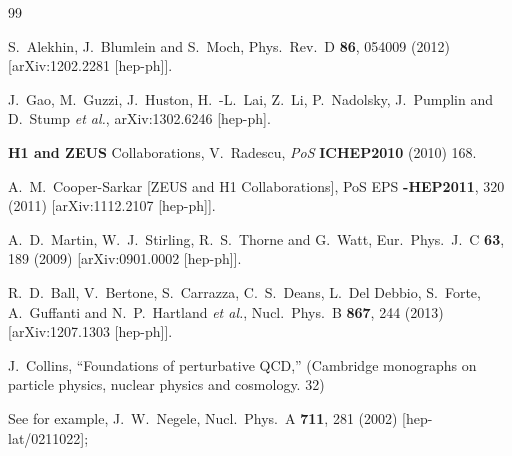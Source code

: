 \begin{thebibliography}{99}


  S.~Alekhin, J.~Blumlein and S.~Moch,
  Phys.\ Rev.\ D {\bf 86}, 054009 (2012)
  [arXiv:1202.2281 [hep-ph]].

  J.~Gao, M.~Guzzi, J.~Huston, H.~-L.~Lai, Z.~Li, P.~Nadolsky, J.~Pumplin and D.~Stump {\it et al.},
  arXiv:1302.6246 [hep-ph].

{\bf H1 and ZEUS} Collaborations, V.~Radescu, %
  {\em PoS} {\bf
  ICHEP2010} (2010) 168.

  A.~M.~Cooper-Sarkar [ZEUS and H1 Collaborations],
  PoS EPS {\bf -HEP2011}, 320 (2011)
  [arXiv:1112.2107 [hep-ph]].

  A.~D.~Martin, W.~J.~Stirling, R.~S.~Thorne and G.~Watt,
  Eur.\ Phys.\ J.\ C {\bf 63}, 189 (2009)
  [arXiv:0901.0002 [hep-ph]].

  R.~D.~Ball, V.~Bertone, S.~Carrazza, C.~S.~Deans, L.~Del Debbio, S.~Forte, A.~Guffanti and N.~P.~Hartland {\it et al.},
  Nucl.\ Phys.\ B {\bf 867}, 244 (2013)
  [arXiv:1207.1303 [hep-ph]].



  J.~Collins,
  ``Foundations of perturbative QCD,''
  (Cambridge monographs on particle physics, nuclear physics and cosmology. 32)

See for example, %
  J.~W.~Negele,
  Nucl.\ Phys.\ A {\bf 711}, 281 (2002)
  [hep-lat/0211022];


\end{thebibliography}
